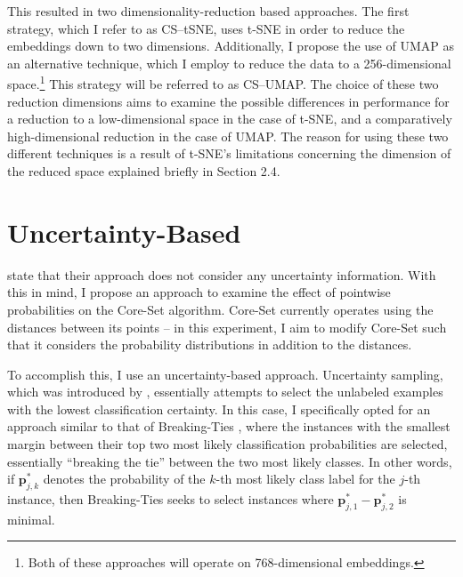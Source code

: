 \documentclass[english,bachelor,ul]{webisthesis} %
\begin{document}
This resulted in two dimensionality-reduction based approaches. The first strategy, which I refer to as CS--tSNE, uses t-SNE in order to reduce the embeddings down to two dimensions. Additionally, I propose the use of UMAP as an alternative technique, which I employ to reduce the data to a 256-dimensional space.\footnote{Both of these approaches will operate on 768-dimensional embeddings.} This strategy will be referred to as CS--UMAP. The choice of these two reduction dimensions aims to examine the possible differences in performance for a reduction to a low-dimensional space in the case of t-SNE, and a comparatively high-dimensional reduction in the case of UMAP. The reason for using these two different techniques is a result of t-SNE's limitations concerning the dimension of the reduced space explained briefly in Section 2.4.

\section{Uncertainty-Based}

\cite{DBLP:conf/iclr/SenerS18} state that their approach does not consider any uncertainty information. With this in mind, I propose an approach to examine the effect of pointwise probabilities on the Core-Set algorithm. Core-Set currently operates using the distances between its points -- in this experiment, I aim to modify Core-Set such that it considers the probability distributions in addition to the distances.

To accomplish this, I use an uncertainty-based approach. Uncertainty sampling, which was introduced by \cite{DBLP:conf/sigir/LewisG94}, essentially attempts to select the unlabeled examples with the lowest classification certainty. In this case, I specifically opted for an approach similar to that of Breaking-Ties \citep{DBLP:journals/jmlr/LuoKGHSRH05}, where the instances with the smallest margin between their top two most likely classification probabilities are selected, essentially ``breaking the tie'' between the two most likely classes. In other words, if $ \mathbf{p}_{j, k}^* $ denotes the probability of the $ k $-th most likely class label for the $ j $-th instance, then Breaking-Ties seeks to select instances where $ \mathbf{p}_{j, 1}^* - \mathbf{p}_{j, 2}^* $ is minimal.
\end{document}
